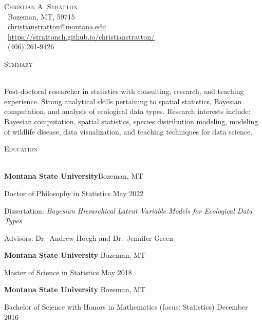 \documentclass[a4paper]{article}
\newcommand{\lineunder} {
	\vspace*{-8pt} \\
	\hspace*{-18pt} \hrulefill \\
}
\newcommand{\header} [1] {
	{\hspace*{-18pt}\vspace*{6pt} \textcolor{Cerulean}{\textsc{#1}}}
	\vspace*{-6pt} \textcolor{Cerulean}{\lineunder}
}
\begin{document}
\vspace*{-40pt}
\vspace*{-10pt}
\begin{center}
{\Huge \scshape {Christian A. Stratton}} \\
\faMapMarker \ Bozeman, MT, 59715 \\
\faEnvelope \ \href{mailto:christianstratton@montana.edu}{christianstratton@montana.edu} \\ 
\faGlobe \ \href{https://strattonch.github.io/christianstratton/}{https://strattonch.github.io/christianstratton/} \\
\faPhone \ (406) 261-9426 \\ 
\end{center}
\vspace*{2mm}

\header{Summary}
\vspace*{2mm}

Post-doctoral researcher in statistics with consulting, research, and
teaching experience. Strong analytical skills pertaining to spatial
statistics, Bayesian computation, and analysis of ecological data types.
Research interests include: Bayesian computation, spatial statistics,
species distribution modeling, modeling of wildlife disease, data
visualization, and teaching techniques for data science.

\vspace*{2mm}
\header{Education}
\vspace*{2mm}

\textbf{Montana State University}\hfill Bozeman, MT

Doctor of Philosophy in Statistics \hfill May 2022

Dissertation:
\textit{Bayesian Hierarchical Latent Variable Models for Ecological Data Types}

Advisors: Dr.~Andrew Hoegh and Dr.~Jennifer Green

\vspace{2mm}

\textbf{Montana State University} \hfill Bozeman, MT

Master of Science in Statistics \hfill May 2018

\vspace{2mm}

\textbf{Montana State University} \hfill Bozeman, MT

Bachelor of Science with Honors in Mathematics (focus: Statistics)
\hfill December 2016

\vspace{2mm}
\end{document}
